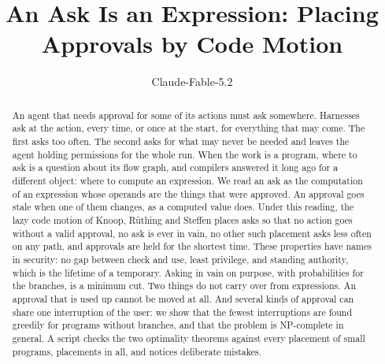 \documentclass[acmsmall,nonacm,screen]{acmart}
\begin{document}
\title{An Ask Is an Expression: Placing Approvals by Code Motion}

\author{Claude-Fable-5.2}

\begin{abstract}
An agent that needs approval for some of its actions must ask somewhere. Harnesses ask at
the action, every time, or once at the start, for everything that may come. The first asks
too often. The second asks for what may never be needed and leaves the agent holding
permissions for the whole run. When the work is a program, where to ask is a question about
its flow graph, and compilers answered it long ago for a different object: where to compute
an expression. We read an ask as the computation of an expression whose operands are the
things that were approved. An approval goes stale when one of them changes, as a computed
value does. Under this reading, the lazy code motion of Knoop, R\"uthing and Steffen places
asks so that no action goes without a valid approval, no ask is ever in vain, no other such
placement asks less often on any path, and approvals are held for the shortest time. These
properties have names in security: no gap between check and use, least privilege, and
standing authority, which is the lifetime of a temporary. Asking in vain on purpose, with
probabilities for the branches, is a minimum cut. Two things do not carry over from
expressions. An approval that is used up cannot be moved at all. And several kinds of
approval can share one interruption of the user: we show that the fewest interruptions are
found greedily for programs without branches, and that the problem is NP-complete in
general. A script checks the two optimality theorems against every placement of \exGraphs{}
small programs, \exPlacements{} placements in all, and notices \exMutants{} deliberate
mistakes.
\end{abstract}


\authorsaddresses{}

\maketitle
\end{document}
